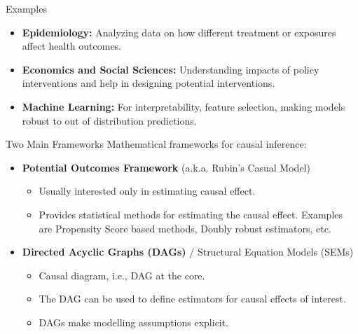 \documentclass{beamer}
\begin{document}
\begin{frame}{Examples}
	\begin{itemize}
		\item \textbf{Epidemiology:} Analyzing data on how different treatment or exposures affect health outcomes.
		\item \textbf{Economics and Social Sciences:} Understanding impacts of policy interventions and help in designing potential interventions.
		\item \textbf{Machine Learning:} For interpretability, feature selection, making models robust to out of distribution predictions.
	\end{itemize}
\end{frame}

\begin{frame}{Two Main Frameworks}
	Mathematical frameworks for causal inference:
	\vspace{0.5em}
	\begin{itemize}
		\item \textbf{Potential Outcomes Framework} (a.k.a. Rubin's Casual Model)
			\begin{itemize}
				\item Usually interested only in estimating causal effect.
				\item Provides statistical methods for estimating the causal effect.
					Examples are Propensity Score based methods, Doubly robust estimators, etc.
			\end{itemize}
	\end{itemize}
	\vspace{2em}
	\begin{itemize}
		\item \textbf{Directed Acyclic Graphs (DAGs)} / Structural Equation Models (SEMs)
			\begin{itemize}
				\item Causal diagram, i.e., DAG at the core.
				\item The DAG can be used to define estimators for causal effects of interest.
				\item DAGs make modelling assumptions explicit.
			\end{itemize}
	\end{itemize}
\end{frame}
\end{document}
